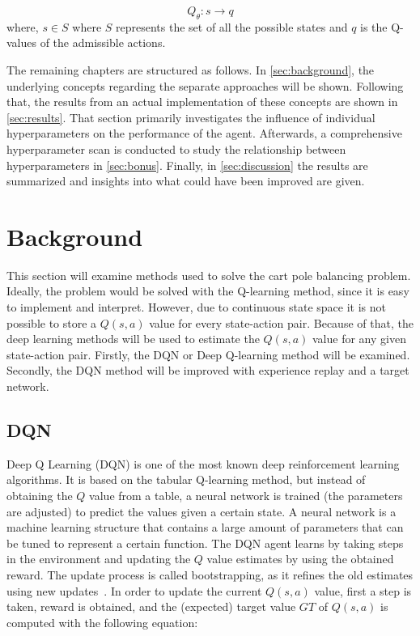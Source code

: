 \documentclass{article}
\begin{document}
\begin{equation}
    Q_{\theta} :  s \rightarrow q
    \label{eq:value-based-approach}
\end{equation}
where, $s \in S$ where $S$ represents the set of all the possible states and $q$ is the Q-values of the admissible actions.


The remaining chapters are structured as follows.
In \autoref{sec:background}, the underlying concepts regarding the separate approaches will be shown.
Following that, the results from an actual implementation of these concepts are shown in \autoref{sec:results}. 
That section primarily investigates the influence of individual hyperparameters on the performance of the agent.
Afterwards, a comprehensive hyperparameter scan is conducted to study the relationship between hyperparameters in \autoref{sec:bonus}.
Finally, in \autoref{sec:discussion} the results are summarized and insights into what could have been improved are given.


\section{Background}
\label{sec:background}
This section will examine methods used to solve the cart pole balancing problem.
Ideally, the problem would be solved with the Q-learning method, since it is easy to implement and interpret.
However, due to continuous state space it is not possible to store a $Q(s,a)$ value for every state-action pair.
Because of that, the deep learning methods will be used to estimate the $Q(s,a)$ value for any given state-action pair.
Firstly, the DQN or Deep Q-learning method will be examined.
Secondly, the DQN method will be improved with experience replay and a target network.

\subsection{DQN}
\label{subsec:dqn}
Deep Q Learning (DQN) is one of the most known deep reinforcement learning algorithms.
It is based on the tabular Q-learning method, but instead of obtaining the $Q$ value from a table,
a neural network is trained (the parameters are adjusted) to predict the values given a certain state.
A neural network is a machine learning structure that contains a large amount of parameters that can be tuned
to represent a certain function.
The DQN agent learns by taking steps in the environment and updating the $Q$ value estimates by using the obtained reward.
The update process is called bootstrapping, as it refines the old estimates using new updates~\cite{DBLP:books/sp/Plaat22}.
In order to update the current $Q(s,a)$ value, first a step is taken, reward is obtained, and the (expected)
target value $GT$ of $Q(s,a)$ is computed with the following equation:
\end{document}
